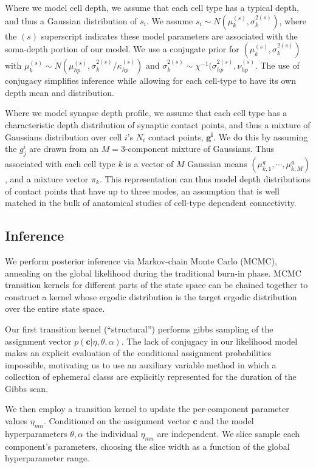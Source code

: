\documentclass{nature}
\renewcommand{\vec}[1]{\mathbf{#1}}
\begin{document}
Where we model cell depth, we assume that 
each cell type has a typical depth, and thus a Gaussian distribution
of $s_i$. We assume $s_i \sim N(\mu^{(s)}_k,
\sigma^{2(s)}_k)$, where the $(s)$ superscript indicates
these model parameters are associated with the soma-depth 
portion of our model.  We use a conjugate prior for $(\mu^{(s)}_k, \sigma^{2(s)}_k)$ with
$\mu^{(s)}_k \sim N(\mu^{(s)}_{hp}, \sigma^{2(s)}_k/ \kappa^{(s)}_{hp})$ and $\sigma^{2(s)}_k \sim
\chi^{-1}(\sigma^{2(s)}_{hp}, \nu^{(s)}_{hp}$. The use of conjugacy simplifies inference while allowing for each cell-type to have its own depth mean and distribution. 

Where we model synapse depth profile, we assume that each cell
type has a characteristic depth distribution of synaptic contact points, and thus
a mixture of Gaussians distribution over cell $i$’s $N_i$ contact points, $\vec{g^i}$.
We do this by assuming the $g^i_j$
are drawn from an $M=3$-component mixture of Gaussians. Thus associated with each cell type $k$ is a vector
of $M$ Gaussian means $(\mu^g_{k,1}, \cdots, \mu^g_{k, M})$, and a
mixture vector $\pi_k$.  This representation can thus model depth distributions of contact points that have up to three modes, an assumption that is well matched in the bulk of anatomical studies of cell-type dependent connectivity.


\subsection{Inference} 
We perform posterior inference via Markov-chain Monte Carlo (MCMC),
annealing on the global likelihood during the traditional burn-in
phase. MCMC transition kernels for different parts of the state space
can be chained together to construct a kernel whose ergodic
distribution is the target ergodic distribution over the entire state space. 

Our first transition kernel (``structural'') performs gibbs sampling 
of the assignment vector $p(\vec{c} | \eta, \theta, \alpha)$. 
The lack of conjugacy in our likelihood model makes an explicit 
evaluation of the conditional assignment probabilities impossible, 
motivating us to use an auxiliary variable method \autocite{Neal2000}
in which a collection of ephemeral classs are explicitly represented
for the duration of the Gibbs scan. 

We then employ a transition kernel to update the per-component
parameter values $\eta_{mn}$. Conditioned on the assignment vector
$\vec{c}$ and the model hyperparameters $\theta, \alpha$ the 
individual $\eta_{mn}$ are independent. We slice sample \autocite{Neal2003}
each component's parameters, choosing the slice width as a function
of the global hyperparameter range. 
\end{document}
